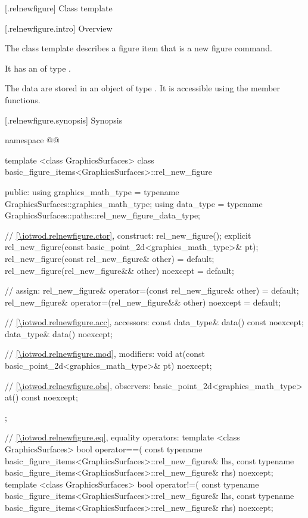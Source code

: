  [\iotwod.relnewfigure] {Class template }

 [\iotwod.relnewfigure.intro] {Overview}

\pnum
{}%
The class template  describes a figure item that is a new figure command.

%
\pnum
It has an  of type .

\pnum
The data are stored in an object of type . It is accessible using the  member functions.

 [\iotwod.relnewfigure.synopsis] {Synopsis}
\begin{codeblock}
namespace @\fullnamespace{}@ {
  template <class GraphicsSurfaces>
  class basic_figure_items<GraphicsSurfaces>::rel_new_figure {
  public:
    using graphics_math_type = typename GraphicsSurfaces::graphics_math_type;
    using data_type =
      typename GraphicsSurfaces::paths::rel_new_figure_data_type;

    // \ref{\iotwod.relnewfigure.ctor}, construct:
    rel_new_figure();
    explicit rel_new_figure(const basic_point_2d<graphics_math_type>& pt);
    rel_new_figure(const rel_new_figure& other) = default;
    rel_new_figure(rel_new_figure&& other) noexcept = default;

    // assign:
    rel_new_figure& operator=(const rel_new_figure& other) = default;
    rel_new_figure& operator=(rel_new_figure&& other) noexcept = default;

    // \ref{\iotwod.relnewfigure.acc}, accessors:
    const data_type& data() const noexcept;
    data_type& data() noexcept;

    // \ref{\iotwod.relnewfigure.mod}, modifiers:
    void at(const basic_point_2d<graphics_math_type>& pt) noexcept;

    // \ref{\iotwod.relnewfigure.obs}, observers:
    basic_point_2d<graphics_math_type> at() const noexcept;
  };
  
  // \ref{\iotwod.relnewfigure.eq}, equality operators:
  template <class GraphicsSurfaces>
  bool operator==(
    const typename basic_figure_items<GraphicsSurfaces>::rel_new_figure& lhs,
    const typename basic_figure_items<GraphicsSurfaces>::rel_new_figure& rhs) 
    noexcept;  
  template <class GraphicsSurfaces>
  bool operator!=(
    const typename basic_figure_items<GraphicsSurfaces>::rel_new_figure& lhs,
    const typename basic_figure_items<GraphicsSurfaces>::rel_new_figure& rhs) 
    noexcept;  
}
\end{codeblock}

